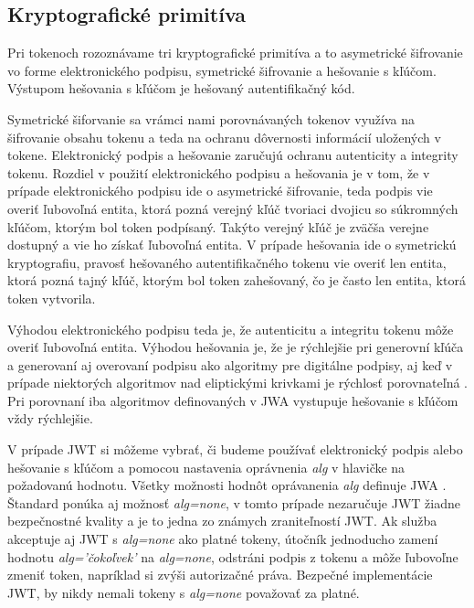\subsection{Kryptografické primitíva}

Pri tokenoch rozoznávame tri kryptografické primitíva a to asymetrické šifrovanie vo forme elektronického podpisu, symetrické šifrovanie a hešovanie s kľúčom. Výstupom hešovania s kľúčom je hešovaný autentifikačný kód. 

Symetrické šiforvanie sa vrámci nami porovnávaných tokenov využíva na šifrovanie obsahu tokenu a teda na ochranu dôvernosti informácií uložených v tokene. Elektronický podpis a hešovanie zaručujú ochranu autenticity a integrity tokenu. Rozdiel v použití elektronického podpisu a hešovania je v tom, že v prípade elektronického podpisu ide o asymetrické šifrovanie, teda  podpis vie overiť ľubovoľná entita, ktorá pozná verejný kľúč tvoriaci dvojicu so súkromných kľúčom, ktorým bol token podpísaný. Takýto verejný kľúč je zväčša verejne dostupný a vie ho získať ľubovoľná entita. V prípade hešovania ide o symetrickú kryptografiu, pravosť hešovaného autentifikačného tokenu vie overiť len entita, ktorá pozná tajný kľúč, ktorým bol token zahešovaný, čo je často len entita, ktorá token vytvorila.

Výhodou elektronického podpisu teda je, že autenticitu a integritu tokenu môže overiť ľubovoľná entita. Výhodou hešovania je, že je rýchlejšie pri generovní kľúča a generovaní aj overovaní podpisu ako algoritmy pre digitálne podpisy, aj keď v prípade niektorých algoritmov nad eliptickými krivkami je rýchlosť porovnateľná \cite{hmac_perf}. Pri porovnaní iba algoritmov definovaných v JWA \cite{hmac_jwt_perf} vystupuje hešovanie s kľúčom vždy rýchlejšie.

V prípade JWT si môžeme vybrať, či budeme používať elektronický podpis alebo hešovanie s kľúčom a pomocou nastavenia oprávnenia \textit{alg} v hlavičke na požadovanú hodnotu. Všetky možnosti hodnôt oprávanenia \textit{alg} definuje  JWA \cite{jwa_rfc}. Štandard ponúka aj možnosť \textit{alg=none}, v tomto prípade nezaručuje JWT žiadne bezpečnostné kvality a je to jedna zo známych zraniteľností \cite{jwt_vul} JWT. Ak služba akceptuje aj JWT s \textit{alg=none} ako platné tokeny, útočník jednoducho zamení hodnotu \textit{alg='čokoľvek'} na \textit{alg=none}, odstráni podpis z tokenu a môže ľubovoľne zmeniť token, napríklad si zvýši autorizačné práva. Bezpečné implementácie JWT, by nikdy nemali tokeny s \textit{alg=none} považovať za platné.

